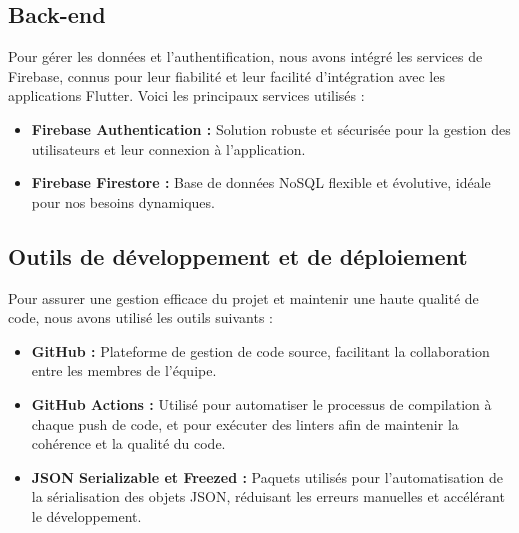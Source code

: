 \subsection{Back-end}

Pour gérer les données et l'authentification, nous avons intégré les services de Firebase, connus pour leur fiabilité et leur facilité d'intégration avec les applications Flutter. Voici les principaux services utilisés :

\begin{itemize}[noitemsep]
    \item \textbf{Firebase Authentication :} Solution robuste et sécurisée pour la gestion des utilisateurs et leur connexion à l'application.
    \item \textbf{Firebase Firestore :} Base de données NoSQL flexible et évolutive, idéale pour nos besoins dynamiques.
\end{itemize}

\subsection{Outils de développement et de déploiement}

Pour assurer une gestion efficace du projet et maintenir une haute qualité de code, nous avons utilisé les outils suivants :

\begin{itemize}[noitemsep]
    \item \textbf{GitHub :} Plateforme de gestion de code source, facilitant la collaboration entre les membres de l'équipe.
    \item \textbf{GitHub Actions :} Utilisé pour automatiser le processus de compilation à chaque push de code, et pour exécuter des linters afin de maintenir la cohérence et la qualité du code.
    \item \textbf{JSON Serializable et Freezed :} Paquets utilisés pour l'automatisation de la sérialisation des objets JSON, réduisant les erreurs manuelles et accélérant le développement.
\end{itemize}

